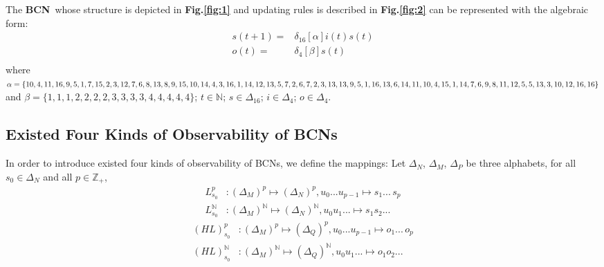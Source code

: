 \documentclass[letterpaper, 10 pt, conference]{ieeeconf}  %
\def \BCN {{\bf BCN}}
\begin{document}
The \BCN\ whose structure is depicted in {\bf Fig.\ref{fig:1}} and updating rules is described in {\bf Fig.\ref{fig:2}} can be represented with the algebraic form:
\begin{equation}
\begin{split}
s(t+1) =&\delta_{16}[\alpha]i(t)s(t)\\
o(t) =&\delta_4[\beta]s(t)\\
\end{split}
\end{equation}
where $\alpha=\{10,4,11,16,9,5,1, 7,15,2,3,12,7,6,8,13,8,9,\\15,10,14,4,3,16,1,14,12,13,5,7,2,6,7,2,3,13,13,9,5,1,\\16,13 ,6,14,11,10,4,15,1,14 ,7,6,9 ,8,11,12,5,5,13,3,10,\\12,16,16\}$ and $\beta=\{1,1,1,2,2,2,2,3,3,3,3,4,4,4,4,4\}$; $t\in \mathbb{N}$; $s\in \Delta_{16}$; $i\in \Delta_4$; $o\in \Delta_4$.
\subsection{Existed Four Kinds of Observability of BCNs}
In order to introduce existed four kinds of observability of BCNs, we define the mappings: Let $\Delta_N$, $\Delta_M$, $\Delta_P$ be three alphabets, for all $s_0\in \Delta_N$ and all $p\in \mathbb{Z}_+$,
\begin{equation}
\begin{split}
L^p_{s_0} &: (\Delta_M)^p\mapsto(\Delta_N)^p, u_0 . . . u_{p-1} \mapsto s_1 . . .\, s_p\\
L^{\mathbb{N}}_{s_0} &: (\Delta_M)^{\mathbb{N}}\mapsto(\Delta_N)^{\mathbb{N}}, u_0 u_1 . . .  \mapsto s_1 s_2 . . .
\end{split}
\end{equation}
\begin{equation}
\begin{split}
(HL)^p_{s_0} &: (\Delta_M)^p\mapsto(\Delta_Q)^p, u_0 . . . u_{p-1} \mapsto o_1 . . .\, o_p\\
(HL)^{\mathbb{N}}_{s_0} &: (\Delta_M)^{\mathbb{N}}\mapsto(\Delta_Q)^{\mathbb{N}}, u_0 u_1 . . .  \mapsto o_1 o_2 . . .
\end{split}
\end{equation}
\end{document}
